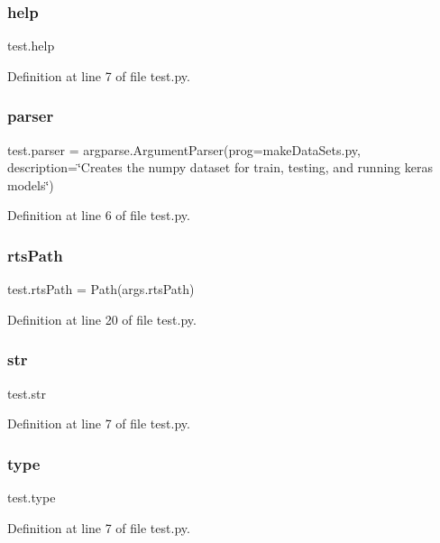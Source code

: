\subsubsection{help}
{\footnotesize\ttfamily test.\+help}



Definition at line 7 of file test.\+py.

\mbox{\label{namespacetest_a5868a2908793ccf384abecffb2e10f9f}} 
\subsubsection{parser}
{\footnotesize\ttfamily test.\+parser = argparse.\+Argument\+Parser(prog=\textquotesingle{}make\+Data\+Sets.\+py\textquotesingle{}, description=\char`\"{}Creates the numpy dataset for train, testing, and running keras models\char`\"{})}



Definition at line 6 of file test.\+py.

\mbox{\label{namespacetest_a1836875f62ed199b8369b0e24b1307ad}} 
\subsubsection{rts\+Path}
{\footnotesize\ttfamily test.\+rts\+Path = Path(args.\+rts\+Path)}



Definition at line 20 of file test.\+py.

\mbox{\label{namespacetest_a25d1c08ead5d6fa93dd0f4422aff1228}} 
\subsubsection{str}
{\footnotesize\ttfamily test.\+str}



Definition at line 7 of file test.\+py.

\mbox{\label{namespacetest_aa5babada9ae94655f1c280efba7fc6f9}} 
\subsubsection{type}
{\footnotesize\ttfamily test.\+type}



Definition at line 7 of file test.\+py.

